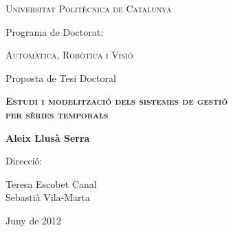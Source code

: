 \begin{titlepage}
  \begin{center} 

   

    {\Large \scshape Universitat Politècnica de Catalunya} \vskip 1cm 

    {Programa de Doctorat:} \vskip 0.5cm 
    
    {\scshape Automàtica, Robòtica i Visió} \vfill%

    {Proposta de Tesi Doctoral} \vskip 1cm 
    
    {\scshape \bfseries \Large Estudi i modelització dels sistemes de gestió\\
       per sèries temporals} \vskip 2cm

    {\bfseries Aleix Llusà Serra} \vfill%

    {Direcció:}
       
    {Teresa Escobet Canal \\
    Sebastià Vila-Marta}  \vskip 1cm 


    {Juny de 2012}

\end{center}
\end{titlepage}




